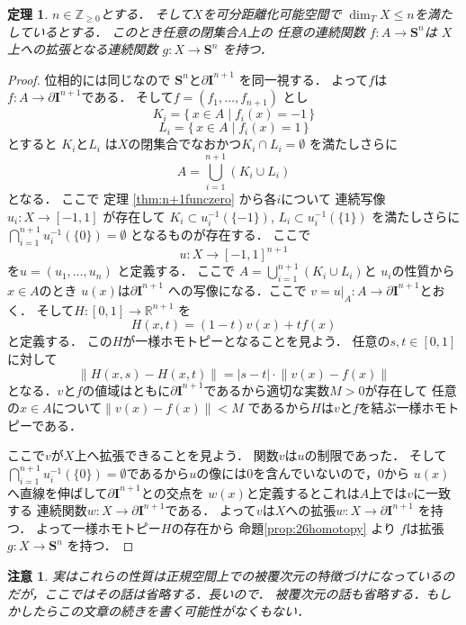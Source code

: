 \documentclass[leqno, a4paper, 12pt]{jsarticle}
\newtheorem{thm}{定理}
\newtheorem*{rmk}{注意}
\newcommand{\zz}{\mathbb{Z}}
\newcommand{\rr}{\mathbb{R}}
\newcommand{\mysphere}[1]{\mathbf{S}^{#1}}
\newcommand{\mycubebd}[1]{\partial\mathbf{I}^{#1}}
\numberwithin{equation}{section}
\begin{document}
\begin{thm}\label{thm:sphereext}
$n\in \zz_{\ge 0}$とする．
そして$X$を可分距離化可能空間で
$\dim_{T}X\le n$を満たしているとする．
このとき任意の閉集合$A$上の
任意の連続関数
$f\colon A\to \mysphere{n}$は
$X$上への拡張となる連続関数
$g\colon X\to \mysphere{n}$
を持つ．
\end{thm}
\begin{proof}
位相的には同じなので
$\mysphere{n}$と$\mycubebd{n+1}$
を同一視する．
よって$f$は$f\colon A\to \mycubebd{n+1}$である．
そして$f=(f_{1}, \dots, f_{n+1})$
とし
\[
K_{i}=\{\, x\in A\mid f_{i}(x)=-1\, \}
\]
\[
L_{i}=\{\, x\in A\mid f_{i}(x)=1\, \}
\]
とすると
$K_{i}$と$L_{i}$
は$X$の閉集合でなおかつ$K_{i}\cap L_{i}=\emptyset$
を満たしさらに
\[
A=\bigcup_{i=1}^{n+1}(K_{i}\cup L_{i})
\]
となる．
ここで
定理
\ref{thm:n+1funczero}
から各$i$について
連続写像$u_{i}\colon X\to [-1, 1]$
が存在して
$K_{i}\subset u_{i}^{-1}(\{-1\})$, 
$L_{i}\subset u_{i}^{-1}(\{1\})$
を満たしさらに
$\bigcap_{i=1}^{n+1}u_{i}^{-1}(\{0\})=\emptyset$
となるものが存在する．
ここで
\[
u\colon X\to [-1, 1]^{n+1}
\]
を$u=(u_{1}, \dots, u_{n})$
と定義する．
ここで
$A=\bigcup_{i=1}^{n+1}(K_{i}\cup L_{i})$と
$u_{i}$の性質から$x\in A$のとき
$u(x)$は$\mycubebd{n+1}$
への写像になる．ここで
$v=u|_{A}\colon A\to \mycubebd{n+1}$とおく．
そして$H\colon [0, 1]\to \rr^{n+1}$
を
\[
H(x, t)=(1-t)v(x)+tf(x)
\]
と定義する．
この$H$が一様ホモトピーとなることを見よう．
任意の$s, t\in [0, 1]$に対して
\[
\lVert H(x, s)-H(x, t)\rVert=|s-t|\cdot \lVert v(x)-f(x) \rVert
\]
となる．$v$と$f$の値域はともに$\mycubebd{n+1}$であるから適切な実数$M>0$が存在して
任意の$x\in A$について$\lVert v(x)-f(x)\rVert<M$
であるから$H$は$v$と$f$を結ぶ一様ホモトピーである．

ここで$v$が$X$上へ拡張できることを見よう．
関数$v$は$u$の制限であった．
そして
$\bigcap_{i=1}^{n+1}u_{i}^{-1}(\{0\})=\emptyset$であるから$u$の像には$0$を含んでいないので，$0$から
$u(x)$へ直線を伸ばして$\mycubebd{n+1}$との交点を
$w(x)$と定義するとこれは$A$上では$v$に一致する
連続関数$w\colon X\to \mycubebd{n+1}$である．
よって$v$は$X$への拡張$w\colon X\to \mycubebd{n+1}$
を持つ．
よって一様ホモトピー$H$の存在から
命題\ref{prop:26homotopy}
より
$f$は拡張
$g\colon X\to \mysphere{n}$
を持つ．
\end{proof}



\begin{rmk}
実はこれらの性質は正規空間上での被覆次元の特徴づけになっているのだが，ここではその話は省略する．長いので．
被覆次元の話も省略する．もしかしたらこの文章の続きを書く可能性がなくもない．
\end{rmk}
\end{document}
